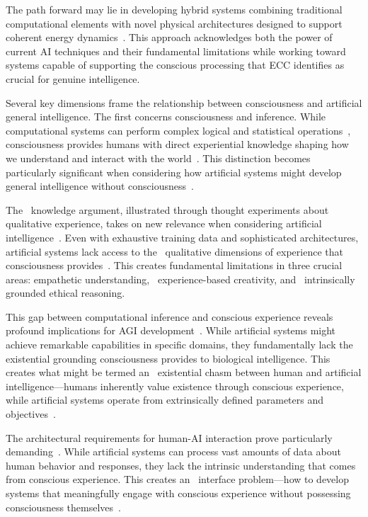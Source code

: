 The path forward may lie in developing hybrid systems combining traditional computational elements with novel physical architectures designed to support coherent energy dynamics~\cite{Furber2017, Merolla2019}. This approach acknowledges both the power of current AI techniques and their fundamental limitations while working toward systems capable of supporting the conscious processing that ECC identifies as crucial for genuine intelligence.

Several key dimensions frame the relationship between consciousness and artificial general intelligence. The first concerns consciousness and inference. While computational systems can perform complex logical and statistical operations~\cite{Pearl2018, Schuman2021}, consciousness provides humans with direct experiential knowledge shaping how we understand and interact with the world~\cite{ORegan2011, Nikolic2019}. This distinction becomes particularly significant when considering how artificial systems might develop general intelligence without consciousness~\cite{Marcus2019, seth2024conscious}.

The~ knowledge argument, illustrated through thought experiments about qualitative experience, takes on new relevance when considering artificial intelligence~\cite{Searle2004, nagel1980like}. Even with exhaustive training data and sophisticated architectures, artificial systems lack access to the~ qualitative dimensions of experience that consciousness provides~\cite{Hoffman2019, block1995confusion}. This creates fundamental limitations in three crucial areas: empathetic understanding,~ experience-based creativity, and~ intrinsically grounded ethical reasoning.

This gap between computational inference and conscious experience reveals profound implications for AGI development~\cite{Bostrom2014, bosl2025dynamical}. While artificial systems might achieve remarkable capabilities in specific domains, they fundamentally lack the existential grounding consciousness provides to biological intelligence. This creates what might be termed an~ existential chasm between human and artificial intelligence—humans inherently value existence through conscious experience, while artificial systems operate from extrinsically defined parameters and objectives~\cite{Mitchell2019, Floridi2011}.

The architectural requirements for human-AI interaction prove particularly demanding~\cite{Hawkins2021, Markovic2020}. While artificial systems can process vast amounts of data about human behavior and responses, they lack the intrinsic understanding that comes from conscious experience. This creates an~ interface problem—how to develop systems that meaningfully engage with conscious experience without possessing consciousness themselves~\cite{Braitenberg1986, Wheeler2005}.

